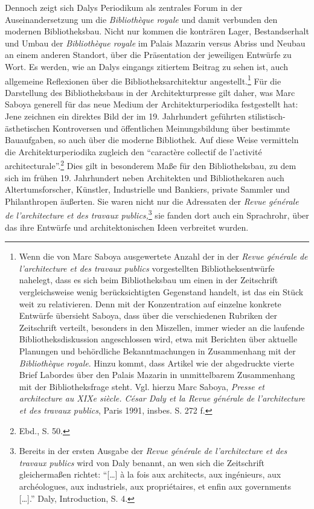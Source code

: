 Dennoch zeigt sich Dalys Periodikum als zentrales Forum in der
Auseinandersetzung um die \emph{Bibliothèque royale} und damit verbunden
den modernen Bibliotheksbau. Nicht nur kommen die konträren Lager,
Bestandserhalt und Umbau der \emph{Bibliothèque royale} im Palais
Mazarin versus Abriss und Neubau an einem anderen Standort, über die
Präsentation der jeweiligen Entwürfe zu Wort. Es werden, wie an Dalys
eingangs zitiertem Beitrag zu sehen ist, auch allgemeine Reflexionen
über die Bibliotheksarchitektur angestellt.\footnote{Wenn die von Marc
  Saboya ausgewertete Anzahl der in der \emph{Revue générale} \emph{de
  l'architecture et des travaux publics} vorgestellten
  Bibliotheksentwürfe nahelegt, dass es sich beim Bibliotheksbau um
  einen in der Zeitschrift vergleichsweise wenig berücksichtigten
  Gegenstand handelt, ist das ein Stück weit zu relativieren. Denn mit
  der Konzentration auf einzelne konkrete Entwürfe übersieht Saboya,
  dass über die verschiedenen Rubriken der Zeitschrift verteilt,
  besonders in den Miszellen, immer wieder an die laufende
  Bibliotheksdiskussion angeschlossen wird, etwa mit Berichten über
  aktuelle Planungen und behördliche Bekanntmachungen in Zusammenhang
  mit der \emph{Bibliothèque royale}. Hinzu kommt, dass Artikel wie der
  abgedruckte vierte Brief Labordes über den Palais Mazarin in
  unmittelbarem Zusammenhang mit der Bibliotheksfrage steht. Vgl. hierzu
  Marc Saboya, \emph{Presse et architecture au XIXe siècle. César Daly
  et la Revue générale de l'architecture et des travaux publics}, Paris
  1991, insbes. S. 272 f.} Für die Darstellung des Bibliotheksbaus in
der Architekturpresse gilt daher, was Marc Saboya generell für das neue
Medium der Architekturperiodika festgestellt hat: Jene zeichnen ein
direktes Bild der im 19. Jahrhundert geführten stilistisch-ästhetischen
Kontroversen und öffentlichen Meinungsbildung über bestimmte
Bauaufgaben, so auch über die moderne Bibliothek. Auf diese Weise
vermitteln die Architekturperiodika zugleich den \enquote{caractère
collectif de l'activité architecturale}.\footnote{Ebd., S. 50.} Dies
gilt in besonderem Maße für den Bibliotheksbau, zu dem sich im frühen
19. Jahrhundert neben Architekten und Bibliothekaren auch
Altertumsforscher, Künstler, Industrielle und Bankiers, private Sammler
und Philanthropen äußerten. Sie waren nicht nur die Adressaten der
\emph{Revue générale de l'architecture et des travaux
publics,}\footnote{Bereits in der ersten Ausgabe der \emph{Revue
  générale de l'architecture et des travaux publics} wird von Daly
  benannt, an wen sich die Zeitschrift gleichermaßen richtet:
  \enquote{{[}\ldots{}{]} à la fois aux architects, aux ingénieurs, aux
  archéologues, aux industriels, aux propriétaires, et enfin aux
  governments {[}\ldots{}{]}.} Daly, Introduction, S. 4.} sie fanden
dort auch ein Sprachrohr, über das ihre Entwürfe und architektonischen
Ideen verbreitet wurden.

